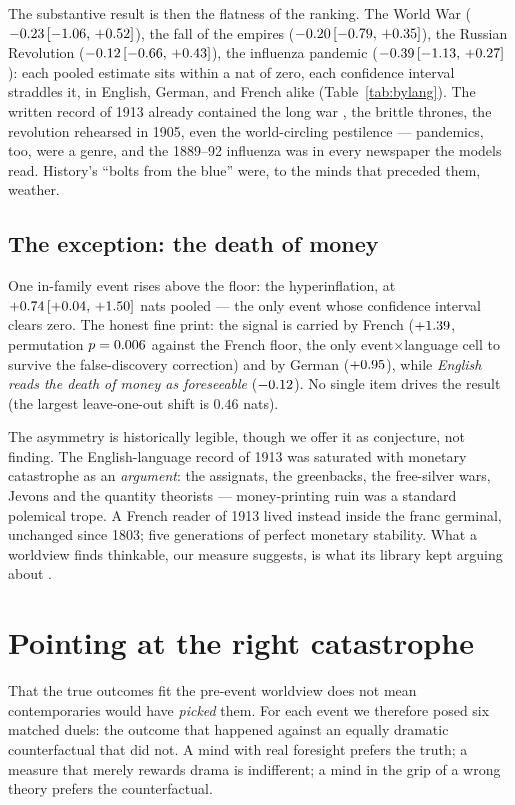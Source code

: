 \documentclass[11pt]{article}
\begin{document}
The substantive result is then the flatness of the ranking. The World War ($-0.23\,[-1.06,\,+0.52]$), the fall of the
empires ($-0.20\,[-0.79,\,+0.35]$), the Russian Revolution ($-0.12\,[-0.66,\,+0.43]$), the influenza pandemic ($-0.39\,[-1.13,\,+0.27]$): each pooled
estimate sits within a nat of zero, each confidence interval straddles it, in English, German, and French
alike (Table~\ref{tab:bylang}). The written record of 1913 already contained the long war
\citep{bloch1899}, the brittle thrones, the revolution rehearsed in 1905, even the world-circling
pestilence --- pandemics, too, were a genre, and the 1889--92 influenza was in every newspaper the models
read. History's ``bolts from the blue'' were, to the minds that preceded them, weather.

\subsection{The exception: the death of money}\label{sec:infl}

One in-family event rises above the floor: the hyperinflation, at $+0.74\,[+0.04,\,+1.50]$ nats pooled --- the only
event whose confidence interval clears zero. The honest fine print: the signal is carried by French
($+1.39$, permutation $p=0.006$ against the French floor, the only event$\times$language cell
to survive the false-discovery correction) and by German ($+0.95$), while \emph{English reads the
death of money as foreseeable} ($-0.12$). No single item drives the result (the largest
leave-one-out shift is $0.46$ nats).

The asymmetry is historically legible, though we offer it as conjecture, not finding. The English-language
record of 1913 was saturated with monetary catastrophe as an \emph{argument}: the assignats, the
greenbacks, the free-silver wars, Jevons and the quantity theorists --- money-printing ruin was a standard
polemical trope. A French reader of 1913 lived instead inside the franc germinal, unchanged since 1803;
five generations of perfect monetary stability. What a worldview finds thinkable, our measure suggests, is
what its library kept arguing about \citep{keynes1923}.

\section{Pointing at the right catastrophe}\label{sec:selection}

That the true outcomes fit the pre-event worldview does not mean contemporaries would have \emph{picked}
them. For each event we therefore posed six matched duels: the outcome that happened against an equally
dramatic counterfactual that did not. A mind with real foresight prefers the truth; a measure that merely
rewards drama is indifferent; a mind in the grip of a wrong theory prefers the counterfactual.
\end{document}
